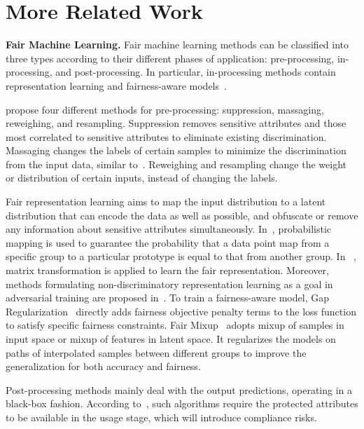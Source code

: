 \section{More Related Work}

\noindent\textbf{Fair Machine Learning.} 
Fair machine learning methods can be classified into three types according to their different phases of application: pre-processing, in-processing, and post-processing. In particular, in-processing methods contain representation learning and fairness-aware models~\cite{ekstrand2021fairness}. 

\citet{Kamiran2012} propose four different methods for pre-processing: suppression, massaging, reweighing, and resampling. 
Suppression removes sensitive attributes and those most correlated to sensitive attributes to eliminate existing discrimination. Massaging changes the labels of certain samples to minimize the discrimination from the input data, similar to~\cite{2009Classifying}. Reweighing and resampling change the weight or distribution of certain inputs, instead of changing the labels. 

Fair representation learning aims to map the input distribution to a latent distribution that can encode the data as well as possible, and obfuscate or remove any information about sensitive attributes simultaneously. In~\cite{Zemellearningfair}, probabilistic mapping is used to guarantee the probability that a data point map from a specific group to a particular prototype is equal to that from another group. In ~\cite{lahoti2019ifair}, matrix transformation is applied to learn the fair representation.
Moreover, methods formulating non-discriminatory representation learning as a goal in adversarial training are proposed in~\cite{feng2019learning,madras2018learning}. 
To train a fairness-aware model, Gap Regularization~\cite{chuang2021fair} directly adds fairness objective penalty terms to the loss function to satisfy specific fairness constraints. 
Fair Mixup~\cite{chuang2021fair} adopts mixup of samples in input space or mixup of features in latent space. It regularizes the models on paths of interpolated samples between different groups to improve the generalization for both accuracy and fairness. 

Post-processing methods mainly deal with the output predictions,
operating in a black-box fashion. According to~\cite{zhou2021bias}, such algorithms require the protected attributes to be available in the usage stage, which will introduce compliance risks.


